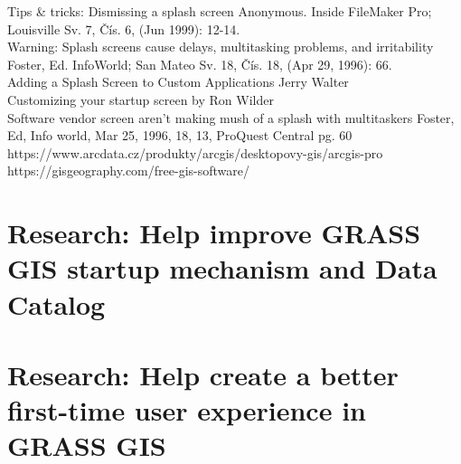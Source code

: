 \documentclass[a4paper,10pt,twoside]{article}
\begin{document}
Tips \& tricks: Dismissing a splash screen Anonymous. Inside FileMaker Pro; Louisville Sv. 7, Čís. 6,  (Jun 1999): 12-14. \\

Warning: Splash screens cause delays, multitasking problems, and irritability Foster, Ed. InfoWorld; San Mateo Sv. 18, Čís. 18,  (Apr 29, 1996): 66. \\

Adding a Splash Screen to Custom Applications Jerry Walter \\

Customizing your startup screen by Ron Wilder \\

Software vendor screen aren't making mush of a splash with multitaskers Foster, Ed, Info world, Mar 25, 1996, 18, 13, ProQuest Central pg. 60 \\

https://www.arcdata.cz/produkty/arcgis/desktopovy-gis/arcgis-pro \\







https://gisgeography.com/free-gis-software/\\

\newpage
\appendix
\section{ Research: Help improve GRASS GIS startup mechanism and Data Catalog}

 \centering 
 

\section{ Research: Help create a better first-time user experience in GRASS GIS}

 \centering 
 
\end{document}

